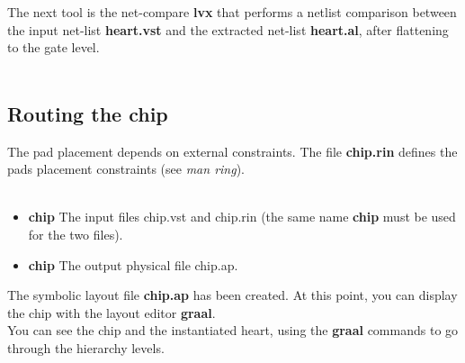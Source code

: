 \documentclass[11pt,a4]{article}
\begin{document}
\begin{itemize}
The next tool is the net-compare {\bf lvx} that performs a netlist comparison 
between the input net-list {\bf heart.vst} and the extracted net-list
{\bf heart.al}, after flattening to the gate level.\\
\\

\end{itemize}

\subsection{Routing the chip}

The pad placement depends on external constraints.
The file {\bf chip.rin} defines the pads placement constraints
(see {\it man ring}).\\
\\
\begin{itemize}
\item {\bf chip} The input files chip.vst and chip.rin (the same name
{\bf chip} must be used for the two files).
\item {\bf chip} The output physical file chip.ap.
\end{itemize}

The symbolic layout file {\bf chip.ap} has been created.
At this point, you can display the chip with the layout editor {\bf graal}.\\
You can see the chip and the instantiated heart, using the {\bf graal} commands to
go through the hierarchy levels.\\
\\
\end{document}
